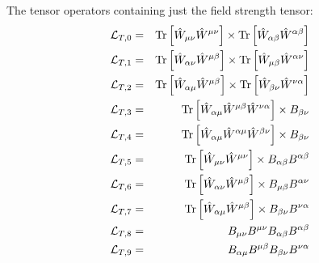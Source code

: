 The tensor operators containing just the field strength tensor:
\begin{eqnarray}
 {\cal L}_{T,0} &=&   \hbox{Tr}\left [ \hat{W}_{\mu\nu} \hat{W}^{\mu\nu} \right ]
\times   \hbox{Tr}\left [ \hat{W}_{\alpha\beta} \hat{W}^{\alpha\beta} \right ]
\\
 {\cal L}_{T,1} &=&   \hbox{Tr}\left [ \hat{W}_{\alpha\nu} \hat{W}^{\mu\beta} \right ]
\times   \hbox{Tr}\left [ \hat{W}_{\mu\beta} \hat{W}^{\alpha\nu} \right ]
\\
 {\cal L}_{T,2} &=&   \hbox{Tr}\left [ \hat{W}_{\alpha\mu} \hat{W}^{\mu\beta} \right ]
\times   \hbox{Tr}\left [ \hat{W}_{\beta\nu} \hat{W}^{\nu\alpha} \right ]
\\
 {\cal L}_{T,3} &=&   \hbox{Tr}\left [ \hat{W}_{\alpha\mu}
   \hat{W}^{\mu\beta}  \hat{W}^{\nu\alpha} \right ]
\times   B_{\beta\nu}
\\
 {\cal L}_{T,4} &=&   \hbox{Tr}\left [ \hat{W}_{\alpha\mu}
   \hat{W}^{\alpha\mu}  \hat{W}^{\beta\nu} \right ]
\times   B_{\beta\nu}
\\
 {\cal L}_{T,5} &=&   \hbox{Tr}\left [ \hat{W}_{\mu\nu} \hat{W}^{\mu\nu} \right ]
\times   B_{\alpha\beta} B^{\alpha\beta}
\\
 {\cal L}_{T,6} &=&   \hbox{Tr}\left [ \hat{W}_{\alpha\nu} \hat{W}^{\mu\beta} \right ]
\times   B_{\mu\beta} B^{\alpha\nu} 
\\
 {\cal L}_{T,7} &=&   \hbox{Tr}\left [ \hat{W}_{\alpha\mu} \hat{W}^{\mu\beta} \right ]
\times   B_{\beta\nu} B^{\nu\alpha} 
\\
 {\cal L}_{T,8} &=&   B_{\mu\nu} B^{\mu\nu}  B_{\alpha\beta} B^{\alpha\beta}
\\
 {\cal L}_{T,9} &=&  B_{\alpha\mu} B^{\mu\beta}   B_{\beta\nu} B^{\nu\alpha} 
\end{eqnarray}

